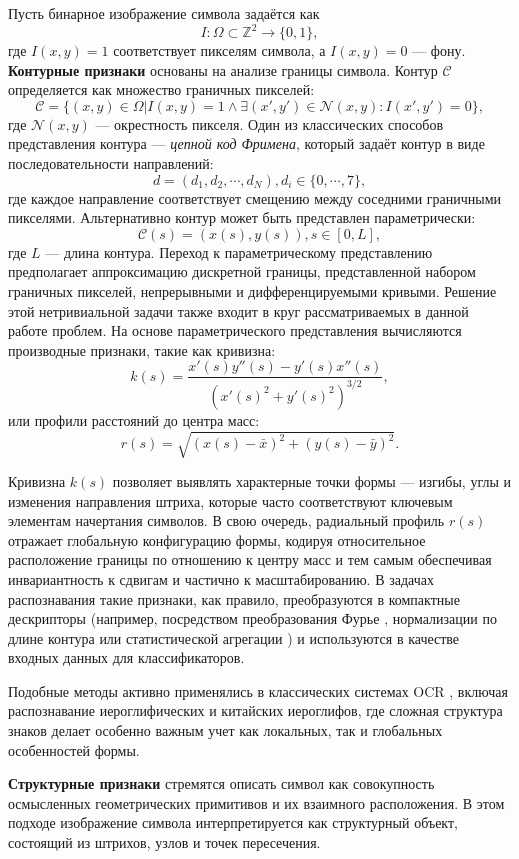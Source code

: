 Пусть бинарное изображение символа задаётся как
\[
    I:\Omega \subset \mathbb{Z}^2\to \{0,1\},
\]
где $I(x,y)=1$ соответствует пикселям символа, а $I(x,y)=0$ — фону. \textbf{Контурные признаки} основаны на анализе границы символа. Контур $\mathcal{C}$ определяется как множество граничных пикселей:
\[
    \mathcal{C} = \{(x,y)\in\Omega | I(x,y) = 1 \land \exists (x', y')\in\mathcal{N}(x,y):I(x', y')=0\},
\]
где $\mathcal{N}(x,y)$ — окрестность пикселя. Один из классических способов представления контура — \textit{цепной код Фримена}, который задаёт контур в виде последовательности направлений:
\[
    d = (d_1, d_2, \cdots,d_N), d_i \in\{0,\cdots,7\},
\]
где каждое направление соответствует смещению между соседними граничными пикселями. Альтернативно контур может быть представлен параметрически:
\[
    \mathcal{C}(s) = (x(s), y(s)), s\in[0,L],
\]
где $L$ — длина контура. Переход к параметрическому представлению предполагает аппроксимацию дискретной границы, представленной набором граничных пикселей, непрерывными и дифференцируемыми кривыми. Решение этой нетривиальной задачи также входит в круг рассматриваемых в данной работе проблем. На основе параметрического представления вычисляются производные признаки, такие как кривизна:
\[
    k(s) = \frac{x'(s)y''(s) - y'(s)x''(s)}{(x'(s)^2 + y'(s)^2)^{3/2}},
\]
или профили расстояний до центра масс:
\[
    r(s) = \sqrt{(x(s) - \bar{x})^2 + (y(s) - \bar{y})^2 }.
\]

Кривизна $k(s)$ позволяет выявлять характерные точки формы — изгибы, углы и изменения направления штриха, которые часто соответствуют ключевым элементам начертания символов. В свою очередь, радиальный профиль $r(s)$ отражает глобальную конфигурацию формы, кодируя относительное расположение границы по отношению к центру масс и тем самым обеспечивая инвариантность к сдвигам и частично к масштабированию. В задачах распознавания такие признаки, как правило, преобразуются в компактные дескрипторы (например, посредством преобразования Фурье \cite{persoon2007shape}, нормализации по длине контура \cite{kuhl_giardina_1982} или статистической агрегации \cite{gatos1997using}) и используются в качестве входных данных для классификаторов.

Подобные методы активно применялись в классических системах OCR \cite{gaurav2012feature, zhong2015high}, включая распознавание иероглифических и китайских иероглифов, где сложная структура знаков делает особенно важным учет как локальных, так и глобальных особенностей формы.

\textbf{Структурные признаки} стремятся описать символ как совокупность осмысленных геометрических примитивов и их взаимного расположения. В этом подходе изображение символа интерпретируется как структурный объект, состоящий из штрихов, узлов и точек пересечения.

